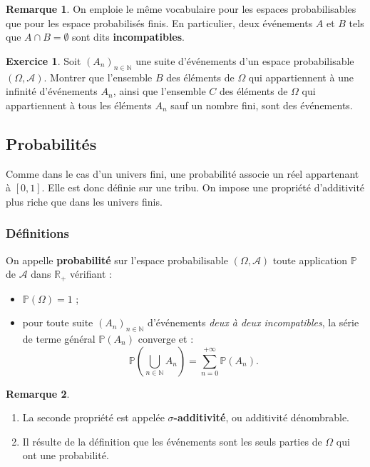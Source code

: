 \documentclass[french]{article}
\renewcommand{\P}{\mathbb{P}}
\newcommand{\N}{\mathbb{N}}
\newcommand{\R}{\mathbb{R}}
\theoremstyle{plain}
\theoremstyle{definition}
\newtheorem{exo}{Exercice}
\newtheorem*{rmq}{Remarque}
\theoremstyle{remark}
\begin{document}
\begin{rmq}
	On emploie le même vocabulaire pour les espaces probabilisables que pour les espace probabilisés finis. En particulier, deux événements $A$ et $B$ tels que $A\cap B=\emptyset$ sont dits \textbf{incompatibles}.
\end{rmq}

\begin{exo}
	Soit $(A_n)_{n\in\N}$ une suite d'événements d'un espace probabilisable $(\Omega,\mathcal{A})$. Montrer que l'ensemble $B$ des éléments de $\Omega$ qui appartiennent à une infinité d'événements $A_n$, ainsi que l'ensemble $C$ des éléments de $\Omega$ qui appartiennent à tous les éléments $A_n$ sauf un nombre fini, sont des événements.
\end{exo}

\subsection{Probabilités}

Comme dans le cas d'un univers fini, une probabilité associe un réel appartenant à $[0,1]$. Elle est donc définie sur une tribu. On impose une propriété d'additivité plus riche que dans les univers finis.

\subsubsection*{Définitions}

\begin{dfn}
	On appelle \textbf{probabilité} sur l'espace probabilisable $(\Omega,\mathcal{A})$ toute application $\P$ de $\mathcal{A}$ dans $\R_+$ vérifiant :
	\begin{itemize}
		\item $\P(\Omega)=1$ ;
		\item pour toute suite $(A_n)_{n\in\N}$ d'événements \textit{deux à deux incompatibles}, la série de terme général $\P(A_n)$ converge et :
		$$\P\left(\bigcup_{n\in\N}A_n\right)=\sum_{n=0}^{+\infty}\P(A_n).$$
	\end{itemize}
\end{dfn}

\begin{rmq}
	\begin{enumerate}
		\item La seconde propriété est appelée \textbf{$\sigma$-additivité}, ou additivité dénombrable.
		\item Il résulte de la définition que les événements sont les seuls parties de $\Omega$ qui ont une probabilité.
	\end{enumerate}
\end{rmq}
\end{document}
